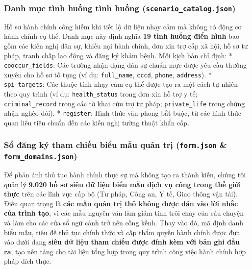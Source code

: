 \documentclass[
  11pt,
  a4paper,
]{article}
\begin{document}
\subsubsection{\texorpdfstring{Danh mục tình huống tình huống
(\texttt{scenario\_catalog.json})}{Danh mục tình huống tình huống (scenario\_catalog.json)}}\label{danh-mux1ee5c-tuxecnh-huux1ed1ng-tuxecnh-huux1ed1ng-scenario_catalog.json}

Hồ sơ hành chính công hiếm khi tiết lộ dữ liệu nhạy cảm mà không có động
cơ hành chính cụ thể. Danh mục này định nghĩa \textbf{19 tình huống điển
hình} bao gồm các kiến \hspace{0pt}\hspace{0pt}nghị dân sự, khiếu nại
hành chính, đơn xin trợ cấp xã hội, hồ sơ tư pháp, tranh chấp lao động
và đăng ký khám bệnh. Mỗi kịch bản chỉ định: * \texttt{cooccur\_fields}:
Các trường nhận dạng dân sự chuẩn mực được yêu cầu thường xuyên cho hồ
sơ tố tụng (ví dụ: \texttt{full\_name}, \texttt{cccd}, \texttt{phone},
\texttt{address}). * \texttt{spi\_targets}: Các thuộc tính nhạy cảm cụ
thể được tạo ra một cách tự nhiên theo quy trình (ví dụ:
\texttt{health\_status} trong đơn xin hỗ trợ y tế;
\texttt{criminal\_record} trong các tờ khai cứu trợ tư pháp;
\texttt{private\_life} trong chứng nhận nghèo đói). * \texttt{register}:
Hình thức văn phong bắt buộc, từ các hình thức quan liêu tiêu chuẩn đến
các kiến \hspace{0pt}\hspace{0pt}nghị tường thuật khẩn cấp.

\subsubsection{\texorpdfstring{Sổ đăng ký tham chiếu biểu mẫu quản trị
(\texttt{form.json} \&
\texttt{form\_domains.json})}{Sổ đăng ký tham chiếu biểu mẫu quản trị (form.json \& form\_domains.json)}}\label{sux1ed5-ux111ux103ng-kuxfd-tham-chiux1ebfu-biux1ec3u-mux1eabu-quux1ea3n-trux1ecb-form.json-form_domains.json}

Để phản ánh thủ tục hành chính thực sự mà không tạo ra thành kiến, chúng
tôi quản lý \textbf{9.020 hồ sơ siêu dữ liệu biểu mẫu dịch vụ công trong
thế giới thực} trên các lĩnh vực cấp bộ (Tư pháp, Công an, Y tế, Giao
thông vận tải). Điều quan trọng là \textbf{các mẫu quản trị thô không
được dán vào lời nhắc của trình tạo}, vì các mẫu nguyên văn làm giảm
tính trôi chảy của câu chuyện và làm cho các cửa sổ ngữ cảnh trở nên
cồng kềnh. Thay vào đó, mã định danh biểu mẫu, tiêu đề thủ tục chính
thức và cấp thẩm quyền hành chính được đưa vào dưới dạng \textbf{siêu dữ
liệu tham chiếu được đính kèm với bản ghi đầu ra}, tạo nền tảng cho tài
liệu tổng hợp trong quy trình công việc hành chính hợp pháp đích thực.
\end{document}

